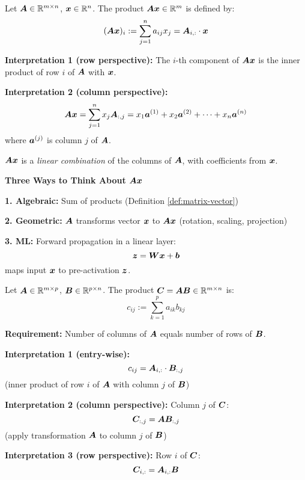 \begin{definition}
    \label{def:matrix-vector}
    Let $\bm{A} \in \mathbb{R}^{m \times n}$, $\bm{x} \in \mathbb{R}^n$. The product $\bm{A}\bm{x} \in \mathbb{R}^m$ is defined by:
    \[
        (\bm{A}\bm{x})_i := \sum_{j=1}^{n} a_{ij} x_j = \bm{A}_{i,:} \cdot \bm{x}
    \]

    \textbf{Interpretation 1 (row perspective):} The $i$-th component of $\bm{A}\bm{x}$ is the inner product of row $i$ of $\bm{A}$ with $\bm{x}$.

    \textbf{Interpretation 2 (column perspective):}
    \[
        \bm{A}\bm{x} = \sum_{j=1}^{n} x_j \bm{A}_{:,j} = x_1\bm{a}^{(1)} + x_2\bm{a}^{(2)} + \cdots + x_n\bm{a}^{(n)}
    \]
    where $\bm{a}^{(j)}$ is column $j$ of $\bm{A}$.

    $\bm{A}\bm{x}$ is a \textit{linear combination} of the columns of $\bm{A}$, with coefficients from $\bm{x}$.
\end{definition}

\begin{intuitionbox}
    \textbf{Three Ways to Think About $\bm{A}\bm{x}$}

    \textbf{1. Algebraic:} Sum of products (Definition \ref{def:matrix-vector})

    \textbf{2. Geometric:} $\bm{A}$ transforms vector $\bm{x}$ to $\bm{A}\bm{x}$ (rotation, scaling, projection)

    \textbf{3. ML:} Forward propagation in a linear layer:
    \[
        \bm{z} = \bm{W}\bm{x} + \bm{b}
    \]
    maps input $\bm{x}$ to pre-activation $\bm{z}$.
\end{intuitionbox}

\begin{definition}
    \label{def:matrix-mult}
    Let $\bm{A} \in \mathbb{R}^{m \times p}$, $\bm{B} \in \mathbb{R}^{p \times n}$. The product $\bm{C} = \bm{A}\bm{B} \in \mathbb{R}^{m \times n}$ is:
    \[
        c_{ij} := \sum_{k=1}^{p} a_{ik} b_{kj}
    \]

    \textbf{Requirement:} Number of columns of $\bm{A}$ equals number of rows of $\bm{B}$.

    \textbf{Interpretation 1 (entry-wise):}
    \[
        c_{ij} = \bm{A}_{i,:} \cdot \bm{B}_{:,j}
    \]
    (inner product of row $i$ of $\bm{A}$ with column $j$ of $\bm{B}$)

    \textbf{Interpretation 2 (column perspective):}
    Column $j$ of $\bm{C}$:
    \[
        \bm{C}_{:,j} = \bm{A} \bm{B}_{:,j}
    \]
    (apply transformation $\bm{A}$ to column $j$ of $\bm{B}$)

    \textbf{Interpretation 3 (row perspective):}
    Row $i$ of $\bm{C}$:
    \[
        \bm{C}_{i,:} = \bm{A}_{i,:} \bm{B}
    \]
\end{definition}


